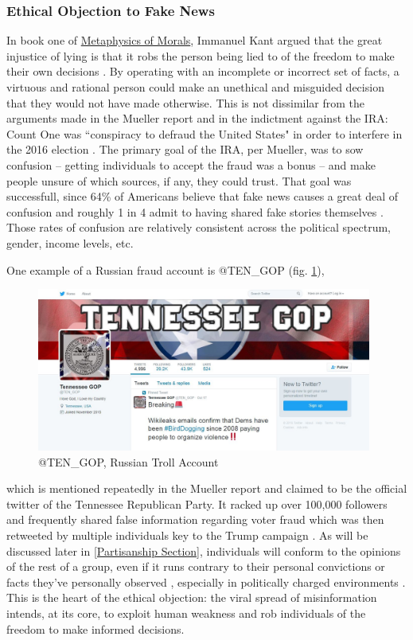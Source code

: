 \documentclass[preprint,review,12pt]{elsarticle}
\begin{document}
\subsubsection{Ethical Objection to Fake News}
In book one of \underline{Metaphysics of Morals}, Immanuel Kant argued that the great injustice of lying is that it robs the person being lied to of the freedom to make their own decisions \cite{kant1996metaphysics}. By operating with an incomplete or incorrect set of facts, a virtuous and rational person could make an unethical and misguided decision that they would not have made otherwise. This is not dissimilar from the arguments made in the Mueller report and in the indictment against the IRA: Count One was ``conspiracy to defraud the United States" in order to interfere in the 2016 election  \cite{mueller2019mueller,mueller2020internet}. The primary goal of the IRA, per Mueller, was to sow confusion -- getting individuals to accept the fraud was a bonus -- and make people unsure of which sources, if any, they could trust. That goal was successfull, since 64\% of Americans believe that fake news causes a great deal of confusion and roughly 1 in 4 admit to having shared fake stories themselves \cite{barthel2016americans}. Those rates of confusion are relatively consistent across the political spectrum, gender, income levels, etc. 

One example of a Russian fraud account is @TEN\_GOP (fig. \ref{fig:Russian Troll Account @TEN_GOP}), \begin{figure}[h]
    \centering
    \includegraphics[width=11cm]{Ten_GOP.jpeg}
    \caption{@TEN\_GOP, Russian Troll Account}
    \label{fig:Russian Troll Account @TEN_GOP}
\end{figure} which is mentioned repeatedly in the Mueller report and claimed to be the official twitter of the Tennessee Republican Party. It racked up over 100,000 followers and frequently shared false information regarding voter fraud which was then retweeted by multiple individuals key to the Trump campaign \cite{mueller2019mueller}. As will be discussed later in \ref{Partisanship Section}, individuals will conform to the opinions of the rest of a group, even if it runs contrary to their personal convictions or facts they've personally observed \cite{asch1956studies}, especially in politically charged environments \cite{bullock2007experiments,housholder2014facebook}.  This is the heart of the ethical objection: the viral spread of misinformation intends, at its core, to exploit human weakness and rob individuals of the freedom to make informed decisions.
\end{document}
